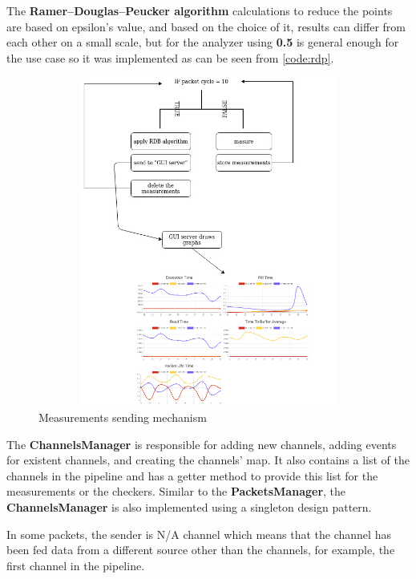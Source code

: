 The \textbf{Ramer–Douglas–Peucker algorithm} calculations to reduce the points are based on epsilon's value,
and based on the choice of it, results can differ from each other on a small scale, but for the analyzer using
\textbf{0.5} is general enough for the use case so it was implemented as can be seen from \ref{code:rdp}.
\newline
\begin{figure}[H]
	\centering
	\includegraphics[width=1.0\textwidth,height=410px]{images/measurement_sending_cycle.jpg}
	\caption{Measurements sending mechanism}
	\label{fig:measurement cycle}
\end{figure}

The \textbf{ChannelsManager} is responsible for adding new channels, adding events for existent channels,
and creating the channels' map. It also contains a list of the channels in the pipeline 
and has a getter method to provide this list for the measurements or the checkers. Similar to the 
\textbf{PacketsManager}, the \textbf{ChannelsManager} is also implemented using a singleton design pattern.

In some packets, the sender is N/A channel which means that the channel has been fed data from a different
source other than the channels, for example, the first channel in the pipeline.

